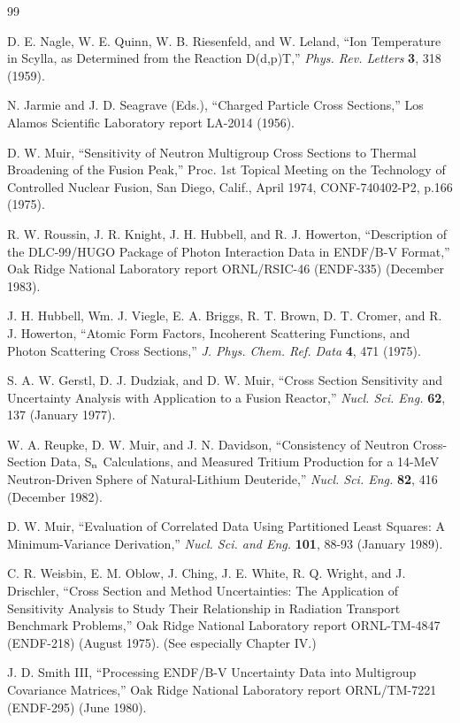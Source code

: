 \documentclass[11pt,twoside]{NJOYMan}
\begin{document}
\begin{thebibliography}{99}
\begin{singlespace}
 D. E. Nagle, W. E. Quinn, W. B. Riesenfeld,
  and W. Leland, ``Ion Temperature in Scylla, as Determined from the
  Reaction D(d,p)T,'' {\it Phys. Rev. Letters} {\bf 3}, 318 (1959).

 N. Jarmie and J. D. Seagrave (Eds.),
  ``Charged Particle Cross Sections,'' Los Alamos Scientific
  Laboratory report LA-2014 (1956).

 D. W. Muir, ``Sensitivity of Neutron Multigroup
  Cross Sections to Thermal Broadening of the Fusion Peak,''
  Proc. 1st Topical Meeting on the Technology of Controlled
  Nuclear Fusion, San Diego, Calif., April 1974,
  CONF-740402-P2, p.166 (1975).

  R. W. Roussin, J. R. Knight, J. H. Hubbell, and R. J. Howerton,
  ``Description of the DLC-99/HUGO Package of Photon Interaction Data in
  ENDF/B-V Format,'' Oak Ridge National Laboratory report ORNL/RSIC-46
  (ENDF-335) (December 1983).

 J. H. Hubbell, Wm. J. Viegle, E. A. Briggs,
  R. T. Brown, D. T. Cromer, and R. J. Howerton, ``Atomic Form Factors,
  Incoherent Scattering Functions, and Photon Scattering Cross Sections,''
  {\it J. Phys. Chem. Ref. Data} {\bf 4}, 471 (1975).

 S. A. W. Gerstl, D. J. Dudziak, and D. W. Muir,
  ``Cross Section Sensitivity and Uncertainty Analysis with Application
  to a Fusion Reactor,'' {\it Nucl. Sci. Eng.} {\bf 62}, 137 (January 1977).

 W. A. Reupke, D. W. Muir, and J. N. Davidson,
  ``Consistency of Neutron Cross-Section Data, S$_{\rm{n}}$ Calculations,
  and Measured Tritium Production for a 14-MeV Neutron-Driven Sphere of
  Natural-Lithium Deuteride,'' {\it Nucl. Sci. Eng.} {\bf 82}, 416 (December
  1982).

 D. W. Muir, ``Evaluation of Correlated Data Using
  Partitioned Least Squares: A Minimum-Variance Derivation,'' {\it Nucl.
  Sci. and Eng.} {\bf 101}, 88-93 (January 1989).

 C. R. Weisbin, E. M. Oblow, J. Ching, J. E. White, R.
  Q. Wright, and J. Drischler, ``Cross Section and Method Uncertainties:
  The Application of Sensitivity Analysis to Study Their Relationship in
  Radiation Transport Benchmark Problems,'' Oak Ridge National Laboratory
  report ORNL-TM-4847 (ENDF-218) (August 1975).  (See especially Chapter IV.)

 J. D. Smith III, ``Processing ENDF/B-V Uncertainty Data
  into Multigroup Covariance Matrices,'' Oak Ridge National Laboratory
  report ORNL/TM-7221 (ENDF-295) (June 1980).


\end{singlespace}
\end{thebibliography}
\end{document}
